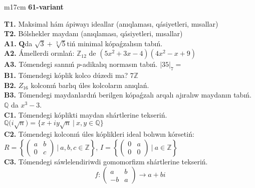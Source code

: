 \documentclass{article}
\begin{document}
\begin{tabular}{m{17cm}}
\textbf{61-variant}
\newline

\textbf{T1.} Maksimal hám ápiwayı ideallar (anıqlaması, qásiyetleri, mısallar) \\
\textbf{T2.} Bólshekler maydanı (anıqlaması, qásiyetleri, mısallar) \\
\textbf{A1.} \(\mathbf{Q}\)da \(\sqrt{3} + \sqrt[3]{5}\)tiń minimal kópaǵzalısın tabıń. \\
\textbf{A2.} Ámellerdi orınlań: \(\mathbb{Z}_{12}\) de \(\left( 5x^{2} + 3x - 4 \right)\left( 4x^{2} - x + 9 \right)\) \\
\textbf{A3.} Tómendegi sannıń \(p\)-adikalıq normasın tabıń. \(|35|_{7} =\) \\
\textbf{B1.} Tómendegi kóplik kolco dúzedi ma? \(7\mathbb{Z}\) \\
\textbf{B2.} \(Z_{16}\) kolconıń barlıq úles kolcoların anıqlań. \\
\textbf{B3.} Tómendegi maydanlardıń berilgen kópaǵzalı arqalı ajıralıw maydanın tabıń. \(\mathbb{Q}\) da \(x^{3} - 3\). \\
\textbf{C1.} Tómendegi kóplikti maydan shártlerine tekseriń. \(\mathbb{Q(}i\sqrt{n}) = \{ x + iy\sqrt{n}\ |\ x,y \in \mathbb{Q}\}\) \\
\textbf{C2.} Tómendegi kolconıń úles kóplikleri ideal bolıwın kórsetiń:
\(R = \left\{ \begin{pmatrix}
a & b \\
0 & c
\end{pmatrix}\ |\ a,b,c \in \mathbb{Z} \right\}\), \(I = \left\{ \begin{pmatrix}
0 & a \\
0 & 0
\end{pmatrix}\ |\ a \in \mathbb{Z} \right\}\) \\
\textbf{C3.} Tómendegi sáwlelendiriwdi gomomorfizm shártlerine tekseriń.
\[f:\begin{pmatrix}
a & b \\
 - b & a
\end{pmatrix} \rightarrow a + bi\] \\

\end{tabular}
\vspace{1cm}
\end{document}

